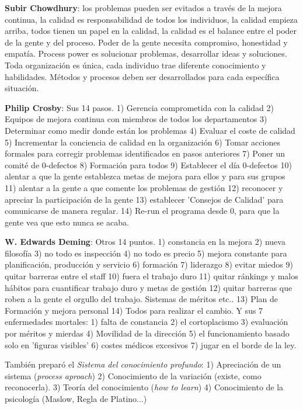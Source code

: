 \documentclass[]{article}
\begin{document}
\textbf{Subir Chowdhury}: los problemas pueden ser evitados a través de la mejora continua, la calidad es responsabilidad de todos los individuos, la calidad empieza arriba, todos tienen un papel en la calidad, la calidad es el balance entre el poder de la gente y del proceso. Poder de la gente necesita compromiso, honestidad y empatía. Process power es solucionar problemas, desarrollar ideas y soluciones. Toda organización es única, cada individuo trae diferente conocimiento y habilidades. Métodos y procesos deben ser desarrollados para cada específica situación.

\textbf{Philip Crosby}: Sus 14 pasos. 1) Gerencia comprometida con la calidad 2) Equipos de mejora continua con miembros de todos los departamentos 3) Determinar como medir donde están los problemas 4) Evaluar el coste de calidad 5) Incrementar la conciencia de calidad en la organización 6) Tomar acciones formales para corregir problemas identificados en pasos anteriores 7) Poner un comité de 0-defectos 8) Formación para todos 9) Establecer el día 0-defectos 10) alentar a que la gente establezca metas de mejora para ellos y para sus grupos 11) alentar a la gente a que comente los problemas de gestión 12) reconocer y apreciar la participación de la gente 13) establecer 'Consejos de Calidad' para comunicarse de manera regular. 14) Re-run el programa desde 0, para que la gente vea que esto nunca se acaba. 

\textbf{W. Edwards Deming}: Otros 14 puntos. 1) constancia en la mejora 2) nueva filosofía 3) no todo es inspección 4) no todo es precio 5) mejora constante para planificación, producción y servicio 6) formación 7) liderazgo 8) evitar miedos 9) quitar barreras entre el staff 10) fuera el trabajo duro 11) quitar ránkings y malos hábitos para cuantificar trabajo duro y metas de gestión 12) quitar barreras que roben a la gente el orgullo del trabajo. Sistemas de méritos etc.. 13) Plan de Formación y mejora personal 14) Todos para realizar el cambio. \newline Y sus 7 enfermedades mortales: 1) falta de constancia 2) el cortoplacismo 3) evaluación por méritos y mierdas 4) Movilidad de la dirección 5) el funcionamiento basado solo en 'figuras visibles' 6) costes médicos excesivos 7) jugar en el borde de la ley. 

También preparó el \textit{Sistema del conocimiento profundo}: 1) Apreciación de un sistema (\textit{process aproach}) 2) Conocimiento de la variación (existe, como reconocerla). 3) Teoría del conocimiento (\textit{how to learn}) 4) Conocimiento de la psicología (Maslow, Regla de Platino...) 
\end{document}
